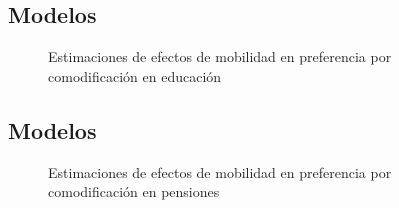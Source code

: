 \documentclass[
  spanish,
  letterpaper,
  DIV=11,
  numbers=noendperiod,
  oneside]{scrartcl}
\begin{document}
\subsection{Modelos}\label{modelos-1}

\begin{figure}

\caption{\label{fig-me}Estimaciones de efectos de mobilidad en
preferencia por comodificación en educación}


\end{figure}%

\subsection{Modelos}\label{modelos-2}

\begin{figure}

\caption{\label{fig-mp}Estimaciones de efectos de mobilidad en
preferencia por comodificación en pensiones}


\end{figure}%
\end{document}
